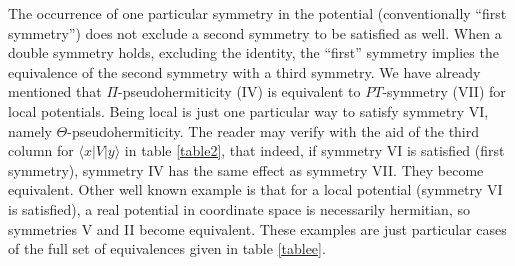  The occurrence of one particular symmetry in the potential (conventionally  ``first symmetry'')
 does not exclude a second symmetry to be satisfied as well.
 When a double symmetry holds, excluding the identity,  the ``first'' symmetry  implies the equivalence of the second symmetry with a third symmetry.
 We have already mentioned that $\Pi$-pseudohermiticity (IV) is equivalent to $PT$-symmetry (VII) for local potentials.
 Being local is just one particular way to satisfy symmetry VI, namely $\Theta$-pseudohermiticity. The reader may verify with the aid of
 the third column for $\langle x|V|y\rangle$  in table \ref{table2}, that indeed, if symmetry VI is satisfied (first symmetry), symmetry IV has the same effect as symmetry VII.
 They become equivalent. Other well known example is  that for a local potential (symmetry VI is satisfied), a real potential in coordinate space  is necessarily hermitian,
 so symmetries V and II become equivalent.
 These examples are just particular cases of the full set of equivalences given in table \ref{tablee}.
%
%
%
%
%
%
%
%
\begin{table}
\caption{Device types for  transmission and/or reflection asymmetry, restricted to 1 or 0 moduli for the scattering amplitudes.
The fifth column indicates the symmetries in table \ref{table2} that forbid the device. Figures S2, S3, S5 and S6 can be found in the supplemental material to this paper.\vspace*{.2cm}}
\label{table1}
\centering
{}
\end{table}



